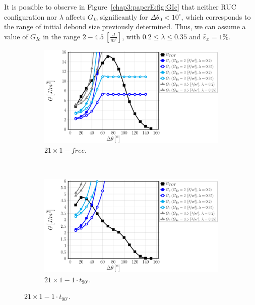 It is possible to observe in Figure~\ref{chap3:paperE:fig:GIc} that neither RUC configuration nor $\lambda$ affects $G_{Ic}$ significantly for $\Delta\theta_{0}<10^{\circ}$, which corresponds to the range of initial debond size previously determined. Thus, we can assume a value of $G_{Ic}$ in the range $2-4.5\ \left[\frac{J}{m^{2}}\right]$, with $0.2\leq\lambda\leq0.35$ and $\bar{\varepsilon}_{x}=1\%$.

\begin{figure}[!htbp]
\centering
    \begin{subfigure}[b]{0.475\textwidth}
        \includegraphics[width=\textwidth]{paperE/vf60-dsize-S10A0.pdf}
        \caption{$21\times 1-free$.}\label{chap3:paperE:fig:debondsize-a}
    \end{subfigure} ~
    \begin{subfigure}[b]{0.475\textwidth}
        \includegraphics[width=\textwidth]{paperE/vf60-dsize-S10A0T1.pdf}
        \caption{$21\times 1-1\cdot t_{90^{\circ}}$.}\label{chap3:paperE:fig:debondsize-b}
    \end{subfigure}


\end{figure}
